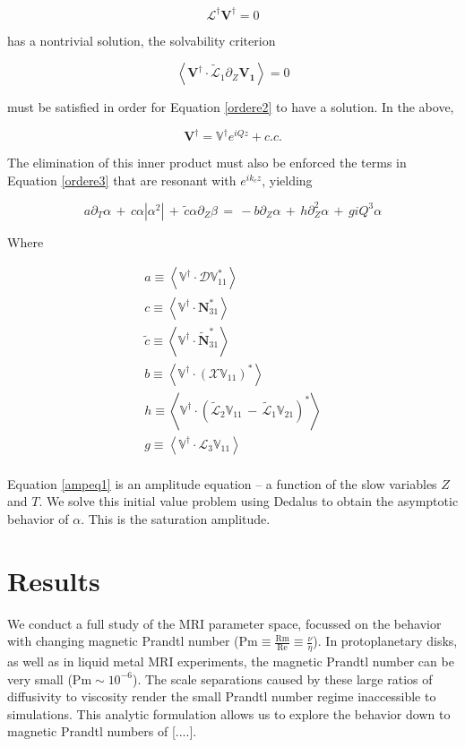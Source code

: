 \documentclass{emulateapj}
\newcommand{\beq}{\begin{equation}}
\newcommand{\eeq}{\end{equation}}
\begin{document}
\beq
\mathcal{L}^\dagger \mathbf{V}^\dagger = 0
\eeq

has a nontrivial solution, the solvability criterion

\beq
\left< \mathbf{V}^\dagger \cdot \widetilde{\mathcal{L}}_1 \partial_Z \mathbf{V_1}\right> = 0 
\eeq

must be satisfied in order for Equation \ref{ordere2} to have a solution. In the above, 

\beq
\mathbf{V}^\dagger = \mathbb{V}^\dagger e^{iQz} + c.c.
\eeq

The elimination of this inner product must also be enforced the terms in Equation \ref{ordere3} that are resonant with $e^{i k_c z}$, yielding

\beq
\label{ampeq1}
a \partial_T \alpha \, + \, c \alpha \left|\alpha^2\right| \, + \, \widetilde{c} \alpha \partial_Z \beta \, = \, - b \partial_Z \alpha \, + \, h \partial_Z^2 \alpha \, + \, g i Q^3 \alpha
\eeq

Where

\begin{multline}
a \equiv \left< \mathbb{V}^\dagger \cdot \mathcal{D}\mathbb{V}^*_{11}\right> \\
c \equiv \left< \mathbb{V}^\dagger \cdot \mathbf{N}^*_{31}\right> \\
\widetilde{c} \equiv \left< \mathbb{V}^\dagger \cdot \widetilde{\mathbf{N}}^*_{31}\right> \\
b \equiv \left< \mathbb{V}^\dagger \cdot \left(\mathcal{X}\mathbb{V}_{11}\right)^* \right> \\
h \equiv \left< \mathbb{V}^\dagger \cdot \left(\widetilde{\mathcal{L}}_2\mathbb{V}_{11} \, - \, \widetilde{\mathcal{L}}_1\mathbb{V}_{21} \right)^* \right> \\
g \equiv \left< \mathbb{V}^\dagger \cdot \mathcal{L}_{3} \mathbb{V}_{11} \right> \\
\end{multline}

Equation \ref{ampeq1} is an amplitude equation -- a function of the slow variables $Z$ and $T$. We solve this initial value problem using Dedalus to obtain the asymptotic behavior of $\alpha$. This is the saturation amplitude.

\section{Results}

We conduct a full study of the MRI parameter space, focussed on the behavior with changing magnetic Prandtl number ($\mathrm{Pm} \equiv \frac{\mathrm{Rm}}{\mathrm{Re}} \equiv \frac{\nu}{\eta}$). In protoplanetary disks, as well as in liquid metal MRI experiments, the magnetic Prandtl number can be very small ($\mathrm{Pm} \sim 10^{-6}$). The scale separations caused by these large ratios of diffusivity to viscosity render the small Prandtl number regime inaccessible to simulations. This analytic formulation allows us to explore the behavior down to magnetic Prandtl numbers of [....].
\end{document}
